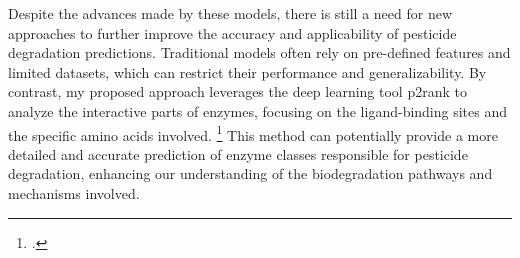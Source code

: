 Despite the advances made by these models, there is still a need for new approaches to further improve the accuracy and applicability of pesticide degradation predictions. Traditional models often rely on pre-defined features and limited datasets, which can restrict their performance and generalizability. By contrast, my proposed approach leverages the deep learning tool p2rank to analyze the interactive parts of enzymes, focusing on the ligand-binding sites and the specific amino acids involved. \footcite{krivakP2RankMachineLearning2018} This method can potentially provide a more detailed and accurate prediction of enzyme classes responsible for pesticide degradation, enhancing our understanding of the biodegradation pathways and mechanisms involved.